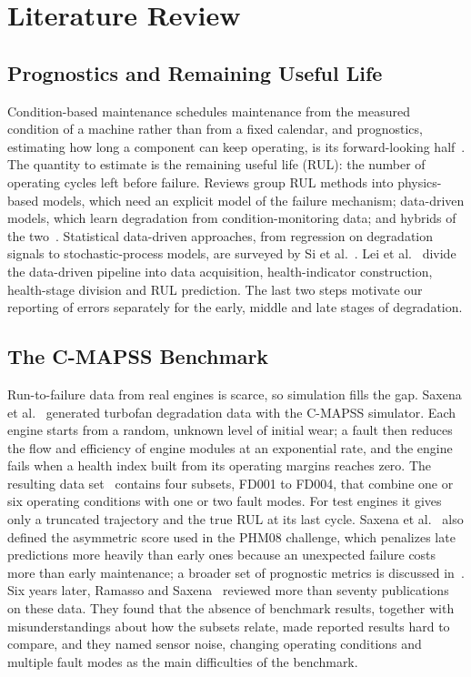 
\section{Literature Review}
\label{sec:literature_review}

\subsection{Prognostics and Remaining Useful Life}
Condition-based maintenance schedules maintenance from the measured condition of a
machine rather than from a fixed calendar, and prognostics, estimating how long a
component can keep operating, is its forward-looking half~\cite{Jardine2006review}.
The quantity to estimate is the remaining useful life (RUL): the number of operating
cycles left before failure. Reviews group RUL methods into physics-based models,
which need an explicit model of the failure mechanism; data-driven models, which learn
degradation from condition-monitoring data; and hybrids of the two~\cite{Lei2018machinery}.
Statistical data-driven approaches, from regression on degradation signals to
stochastic-process models, are surveyed by Si et al.~\cite{Si2011remaining}.
Lei et al.~\cite{Lei2018machinery} divide the data-driven pipeline into data
acquisition, health-indicator construction, health-stage division and RUL prediction.
The last two steps motivate our reporting of errors separately for the early, middle
and late stages of degradation.

\subsection{The C-MAPSS Benchmark}
Run-to-failure data from real engines is scarce, so simulation fills the gap.
Saxena et al.~\cite{Saxena2008damage} generated turbofan degradation data with the
C-MAPSS simulator. Each engine starts from a random, unknown level of initial wear; a
fault then reduces the flow and efficiency of engine modules at an exponential rate,
and the engine fails when a health index built from its operating margins reaches zero.
The resulting data set~\cite{Saxena2008turbofan} contains four subsets, FD001 to FD004,
that combine one or six operating conditions with one or two fault modes. For test
engines it gives only a truncated trajectory and the true RUL at its last cycle.
Saxena et al.~\cite{Saxena2008damage} also defined the asymmetric score used in the
PHM08 challenge, which penalizes late predictions more heavily than early ones because
an unexpected failure costs more than early maintenance; a broader set of prognostic
metrics is discussed in~\cite{Saxena2008metrics}. Six years later, Ramasso and
Saxena~\cite{Ramasso2014performance} reviewed more than seventy publications on these
data. They found that the absence of benchmark results, together with misunderstandings
about how the subsets relate, made reported results hard to compare, and they named
sensor noise, changing operating conditions and multiple fault modes as the main
difficulties of the benchmark.

